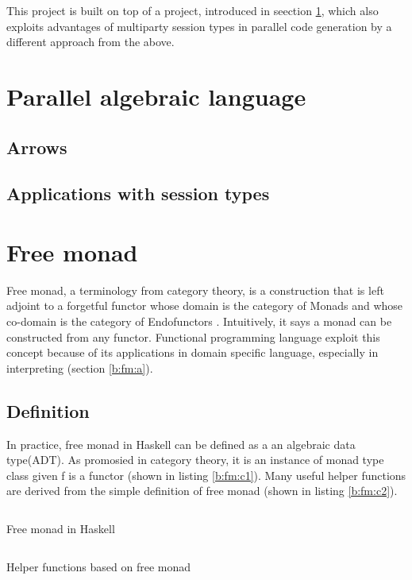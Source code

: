 This project is built on top of a project, introduced in seection \ref{b:pal}, which also exploits advantages of multiparty session types in parallel code generation by a different approach from the above.
\section{Parallel algebraic language} \label{b:pal}
\subsection{Arrows}
\subsection{Applications with session types}
\section{Free monad}
Free monad, a terminology from category theory, is a construction that is left adjoint to a forgetful functor whose domain is the category of Monads and whose co-domain is the category of Endofunctors \cite{contributorsCatsFreeMonads}. Intuitively, it says a monad can be constructed from any functor. Functional programming language exploit this concept because of its applications in domain specific language, especially in interpreting (section \ref{b:fm:a}).
\subsection{Definition}
In practice, free monad in Haskell can be defined as a an algebraic data type(ADT). As promosied in category theory, it is an instance of monad type class given f is a functor (shown in listing \ref{b:fm:c1}). Many useful helper functions are derived from the simple definition of free monad (shown in listing \ref{b:fm:c2}).
\begin{listing}[ht]
  \inputminted{haskell}{background/fm-construction.hs}
  \caption{Free monad in Haskell}
  \label{b:fm:c1}
\end{listing}
\begin{listing}[ht]
  \inputminted{haskell}{background/fm-helper.hs}
  \caption{Helper functions based on free monad}
  \label{b:fm:c2}
\end{listing}
